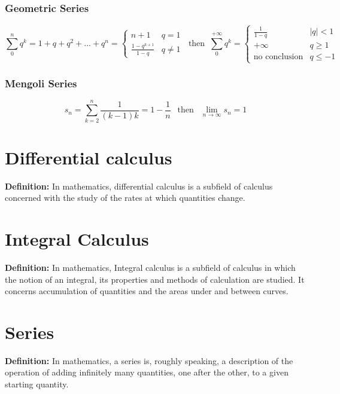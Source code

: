 \subsubsection{Geometric Series}
\[
\sum_{0}^{n}q^k=1+q+q^2+...+q^n= \begin{cases}
									n+1 & q=1 \\
									\frac{1-q^{k+1}}{1-q} & q\ne1
								 \end{cases}
~ \text{ then } ~
\sum_{0}^{+\infty}q^k= \begin{cases}
\frac{1}{1-q} & \left|q\right|<1 \\
+\infty & q\ge1 \\
\text{no conclusion} & q\le-1
\end{cases}
\]

\subsubsection{Mengoli Series}
\[
s_n=\sum_{k=2}^{n}\frac{1}{(k-1)k}=1-\frac{1}{n} ~~ \text{ then } ~~  \lim_{n\rightarrow\infty}s_n=1
\]

\section{Differential calculus}
\textbf{Definition:} In mathematics, differential calculus is a subfield of calculus concerned with the study of the rates at which quantities change.





\section{Integral Calculus}
\textbf{Definition:} In mathematics, Integral calculus is a subfield of calculus in which the notion of an integral, its properties and methods of calculation are studied. It concerns accumulation of quantities and the areas under and between curves.





\section{Series}	
\textbf{Definition:} In mathematics, a series is, roughly speaking, a description of the operation of adding infinitely many quantities, one after the other, to a given starting quantity.




